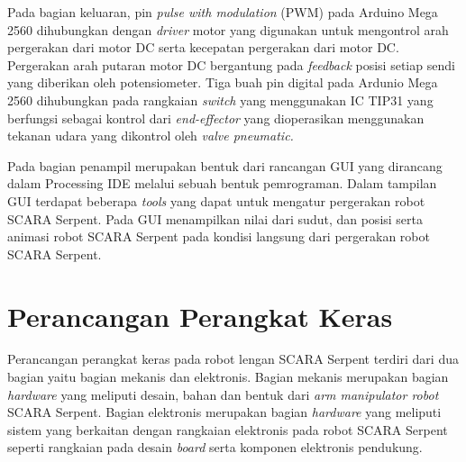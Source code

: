 Pada bagian keluaran, pin \textit{pulse with modulation} (PWM) pada Arduino Mega 2560 dihubungkan dengan \textit{driver} motor yang digunakan untuk mengontrol arah pergerakan dari motor DC serta kecepatan pergerakan dari motor DC. Pergerakan arah putaran motor DC bergantung pada \textit{feedback} posisi setiap sendi yang diberikan oleh potensiometer. Tiga buah pin digital pada Ardunio Mega 2560 dihubungkan pada rangkaian \textit{switch} yang menggunakan IC TIP31 yang berfungsi sebagai kontrol dari \textit{end-effector} yang dioperasikan menggunakan tekanan udara yang dikontrol oleh \textit{valve pneumatic.}

Pada bagian penampil merupakan bentuk dari rancangan GUI yang dirancang dalam Processing IDE melalui sebuah bentuk pemrograman. Dalam tampilan GUI terdapat beberapa \textit{tools} yang dapat untuk mengatur pergerakan robot SCARA Serpent. Pada GUI menampilkan nilai dari sudut, dan posisi serta animasi robot SCARA Serpent pada kondisi langsung dari pergerakan robot SCARA Serpent.
\section{ Perancangan Perangkat Keras }
Perancangan perangkat keras pada robot lengan SCARA Serpent terdiri dari dua bagian yaitu bagian mekanis dan elektronis. Bagian  mekanis merupakan bagian \textit{hardware} yang meliputi desain, bahan dan bentuk dari\textit{ arm manipulator robot} SCARA Serpent. Bagian elektronis merupakan bagian \textit{hardware} yang meliputi sistem yang berkaitan dengan rangkaian elektronis pada robot SCARA Serpent seperti rangkaian pada desain \textit{board} serta komponen elektronis pendukung.
